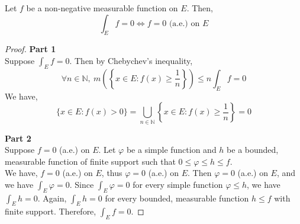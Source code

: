 \begin{theorem}
	Let $f$ be a non-negative measurable function on $E$.
	Then,
	\begin{equation}
		\int_E f = 0 \iff f = 0 \text{ (a.e.) on } E
	\end{equation}
\end{theorem}
\begin{proof}
	\textbf{Part 1}\\
	Suppose $\displaystyle \int_E f = 0$.
	Then by Chebychev's inequality,
	$$\forall n \in \mathbb{N},\  m\left(\left\{x \in E : f(x) \ge \frac{1}{n} \right\}\right) \le n\int_E f = 0$$
	We have,
	$$ \{ x \in E : f(x) > 0 \} = \bigcup_{n \in \mathbb{N}} \left\{ x \in E : f(x) \ge \frac{1}{n} \right\} = 0$$

	\textbf{Part 2}\\
	Suppose $f = 0$ (a.e.) on $E$.
	Let $\varphi$ be a simple function and $h$ be a bounded, measurable function of finite support such that $0 \le \varphi \le h \le f$.\\

	We have, $f = 0$ (a.e.) on $E$, thus $\varphi =  0$ (a.e.) on $E$.
	Then $\varphi = 0$ (a.e.) on $E$, and we have $\int_E \varphi =  0$.
	Since $\int_E \varphi = 0$ for every simple function $\varphi \le h$, we have $\int_E h = 0$. 
	Again,  $\int_E h = 0$ for every bounded, measurable function $h \le f$  with finite support.
	Therefore, $\int_E f =  0$.
\end{proof}


